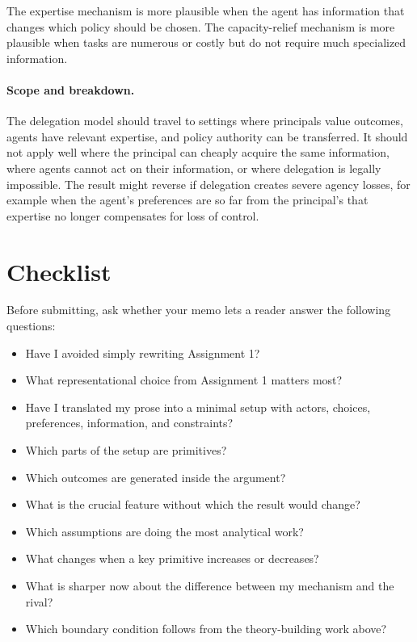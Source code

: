 \documentclass[12pt]{article}
\begin{document}
The expertise mechanism is more plausible when the agent has information that changes which policy should be chosen. The capacity-relief mechanism is more plausible when tasks are numerous or costly but do not require much specialized information.

\paragraph{Scope and breakdown.}
The delegation model should travel to settings where principals value outcomes, agents have relevant expertise, and policy authority can be transferred. It should not apply well where the principal can cheaply acquire the same information, where agents cannot act on their information, or where delegation is legally impossible. The result might reverse if delegation creates severe agency losses, for example when the agent's preferences are so far from the principal's that expertise no longer compensates for loss of control.

\section*{Checklist}

Before submitting, ask whether your memo lets a reader answer the following questions:
\begin{itemize}
\item Have I avoided simply rewriting Assignment 1?
\item What representational choice from Assignment 1 matters most?
\item Have I translated my prose into a minimal setup with actors, choices, preferences, information, and constraints?
\item Which parts of the setup are primitives?
\item Which outcomes are generated inside the argument?
\item What is the crucial feature without which the result would change?
\item Which assumptions are doing the most analytical work?
\item What changes when a key primitive increases or decreases?
\item What is sharper now about the difference between my mechanism and the rival?
\item Which boundary condition follows from the theory-building work above?
\end{itemize}
\end{document}
